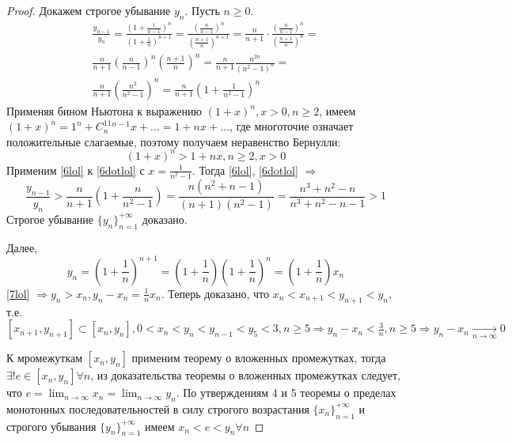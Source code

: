 \documentclass[main]{subfiles}
\begin{document}
\begin{proof}
    Докажем строгое убывание $y_n$. Пусть $n \geq 0$.
    \begin{multline}\label{6lol}
        \frac{y_{n-1}}{y_n} = 
        \frac{\left(1 + \frac{1}{n-1}\right)^n}{\left(1 + \frac{1}{n}\right)^{n+1}} =
        \frac{\left(\frac{n}{n-1}\right)^n}{\left(\frac{n+1}{n}\right)^{n+1}} = 
        \frac{n}{n+1}\cdot\frac{\left(\frac{n}{n-1}\right)^n}{\left(\frac{n+1}{n}\right)^{n}} = \\
        \frac{n}{n+1}\left(\frac{n}{n-1}\right)^n\left(\frac{n+1}{n}\right)^n = 
        \frac{n}{n+1}\frac{n^{2n}}{(n^2 - 1)^n} = \\
        \frac{n}{n+1}\left(\frac{n^{2}}{n^2 - 1}\right)^n = 
        \frac{n}{n+1}\left(1 + \frac{1}{n^2 - 1}\right)^n
    \end{multline}
    Применяя бином Ньютона к выражению $(1 + x)^n, x > 0, n \geq 2$, имеем
    $(1 + x)^n = 1^n + C_n^11^{n-1}x + \ldots = 1 + nx + \ldots$,
    где многоточие означает положительные слагаемые, поэтому получаем
    неравенство Бернулли:
    \begin{equation}\label{6dotlol}
        (1 + x)^n > 1 + nx, n\geq 2, x > 0
    \end{equation}
    Применим \ref{6lol} к \ref{6dotlol} с $x = \frac{1}{n^2 - 1}$. Тогда
    \ref{6lol}, \ref{6dotlol} $\Rightarrow$
    \begin{equation*}
        \frac{y_{n-1}}{y_n} > \frac{n}{n + 1}\left(1 + \frac{n}{n^2 - 1}\right) =
        \frac{n(n^2+n-1)}{(n+1)(n^2-1)} = \frac{n^3 + n^2 - n}{n^3 + n^2 - n - 1} 
        > 1
    \end{equation*}
    Строгое убывание $\{y_n\}_{n=1}^{+\infty}$ доказано.
    
    Далее,
    \begin{equation}\label{7lol}
        y_n = \left(1 + \frac{1}{n}\right)^{n+1} = \left(1 + \frac{1}{n}\right)
        \left(1 + \frac{1}{n}\right)^n = \left(1 + \frac{1}{n}\right)x_n
    \end{equation}
    \ref{7lol} $\Rightarrow y_n > x_n, y_n - x_n = \frac{1}{n}x_n$. 
    Теперь доказано, что
    $x_n < x_{n+1} < y_{n+1} < y_n$, т.е. $[x_{n+1}, y_{n+1}] \subset [x_n, y_n],
    0 < x_n < y_n < y_{n-1} < y_5 < 3, n \geq 5 \Rightarrow y_n - x_n < \frac{3}{n},
    n \geq 5 \Rightarrow y_n - x_n \underset{n\to\infty}{\to} 0$

    К мромежуткам $[x_n, y_n]$ применим теорему о вложенных промежутках, 
    тогда $\exists! e \in [x_n, y_n] \forall n$, из доказательства теоремы 
    о вложенных промежутках следует, что $e = \lim_{n\to\infty}x_n = 
    \lim_{n\to\infty}y_n$. По утверждениям 4 и 5 теоремы о пределах 
    монотонных последовательностей в силу строгого возрастания 
    $\{x_n\}_{n=1}^{+\infty}$ и строгого убывания $\{y_n\}_{n=1}^{+\infty}$
    имеем $x_n < e < y_n \forall n$
\end{proof}
\end{document}
